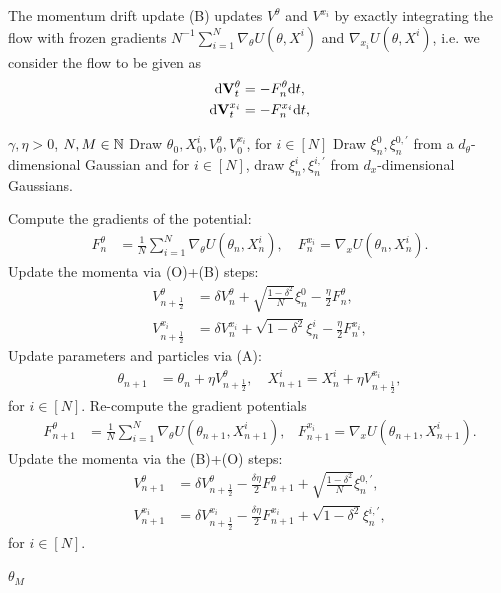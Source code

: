 The momentum drift update (B) updates $V^\theta$ and $V^{x_i}$ by exactly integrating the flow with frozen gradients $N^{-1} \sum_{i=1}^N \nabla_\theta U(\theta, X^i)$ and $\nabla_{x_i}U(\theta, X^i)$, i.e. we consider the flow to be given as
\begin{align*}
\mathrm{d} {\mathbf V}_t^\theta &= - F_n^\theta \mathrm{d}t,\\
\mathrm{d} {\mathbf V}_t^{x_i} &= - F_n^{x_i} \mathrm{d}t,
\end{align*}
\begin{algorithm}[b!]
\caption{KIPLMC2 Algorithm}\label{alg:KIPLMC2}
\begin{algorithmic}[1]
\Require $\gamma, \eta > 0$, $N, M \in {\mathbb N}$
\State Draw $\theta_0, X^i_0, V^\theta_0, V^{x_i}_0$, for $i\in [N]$
    \State Draw $\xi_n^0, \xi^{0,\prime}_n$ from a $d_\theta$-dimensional Gaussian and for $i\in [N]$, draw $\xi_n^i, \xi^{i,\prime}_n$ from $d_x$-dimensional Gaussians.

    \State Compute the gradients of the potential:
    \small
    \begin{align*}
        F_n^\theta &= \frac{1}{N} \sum_{i=1}^N \nabla_\theta U(\theta_n, X_n^i),\quad
        F_n^{x_i} = \nabla_x U(\theta_n, X_n^i).
    \end{align*}
    \normalsize
    \State Update the momenta via (O)+(B) steps:
    \small
    \begin{align*}
    V_{n+\frac{1}{2}}^\theta &= \delta V_n^\theta + \sqrt{\frac{1-\delta^2}{N}} \xi_n^0 - \frac{\eta}{2} F_n^\theta,\\
    V_{n+\frac{1}{2}}^{x_i} &= \delta V_n^{x_i} + \sqrt{1-\delta^2} \xi_n^i - \frac{\eta}{2} F_n^{x_i},
    \end{align*}
    \normalsize
    \State Update parameters and particles via (A):
    \small
    \begin{align*}
    \theta_{n+1} &= \theta_n + \eta V_{n+\frac{1}{2}}^\theta,\quad
    X_{n+1}^i = X_n^i + \eta V_{n+\frac{1}{2}}^{x_i},
    \end{align*}
    \normalsize
    for $i\in [N]$.
    \State Re-compute the gradient potentials 
    \small
    \begin{align*}
    F_{n+1}^\theta &= \frac{1}{N} \sum_{i=1}^N \nabla_\theta U(\theta_{n+1}, X_{n+1}^i), &
    F_{n+1}^{x_i} = \nabla_x U(\theta_{n+1}, X_{n+1}^i).
    \end{align*}
    \normalsize
    \State Update the momenta via the (B)+(O) steps:
    \small
    \begin{align*}
    V_{n+1}^\theta &= \delta V_{n+\frac{1}{2}}^\theta - \frac{\delta \eta}{2}F_{n+1}^\theta +\sqrt{\frac{1-\delta^2}{N}} \xi_n^{0,\prime},\\
    V_{n+1}^{x_i} &= \delta V_{n+\frac{1}{2}}^{x_i} - \frac{\delta\eta}{2} F_{n+1}^{x_i} + \sqrt{1-\delta^2} \xi_n^{i,\prime},
    \end{align*}
    \normalsize
    for $i\in[N]$.
    \EndFor
    
\Return $\theta_{M}$
\end{algorithmic}
\end{algorithm}
